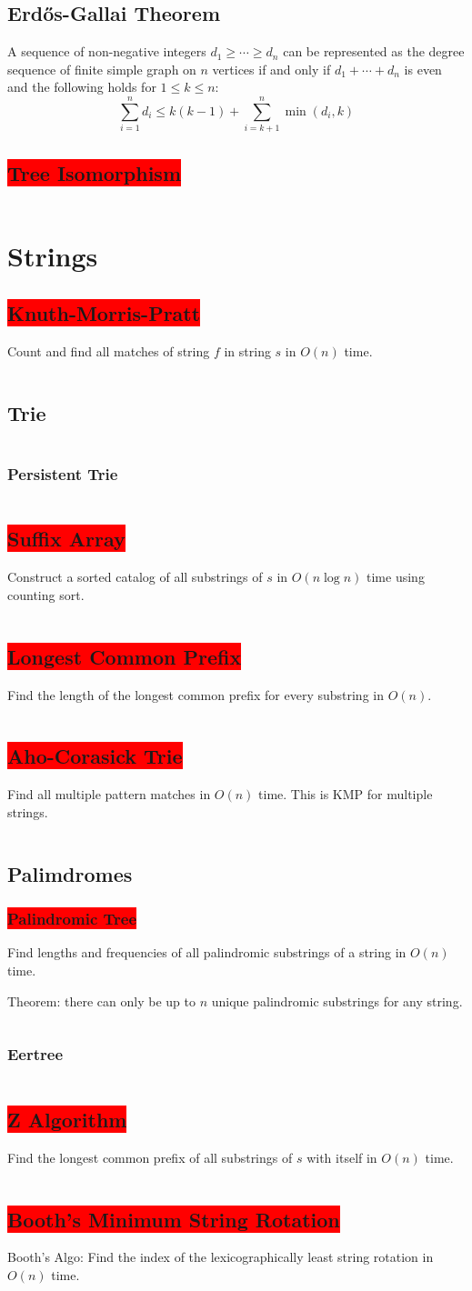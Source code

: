 \documentclass[8pt,a4paper,landscape,oneside]{amsart}
\newcommand{\code}[1]{\inputminted[fontsize=\normalsize,baselinestretch=1]{cpp}{_code/#1}}
\newcommand{\subsectionRed}[1]{\subsection{\colorbox{red}{\color{white}#1}}}
\newcommand{\subsubsectionRed}[1]{\subsubsection{\colorbox{red}{\color{white}#1}}}
\begin{document}
\begin{multicols*}{3}
  \subsection{Erd\H{o}s-Gallai Theorem}
    A sequence of non-negative integers $d_1 \ge \cdots \ge d_n$ can be represented as the
    degree sequence of finite simple graph on $n$ vertices if and only if $d_1 + \cdots + d_n$ is
    even and the following holds for $1 \le k \le n$:
    \[
    \sum_{i=1}^n d_i \le k(k-1) + \sum_{i=k+1}^n \min\left(d_i, k\right)
    \]
  \subsectionRed{Tree Isomorphism}
    \code{graphs/tree_isomorphism.cpp}
\section{Strings}
  \subsectionRed{Knuth-Morris-Pratt}
    Count and find all matches of string $f$ in string $s$ in $O(n)$ time.
    \code{strings/kmp.cpp}
  \subsection{Trie}
    \code{strings/trie.cpp}
    \subsubsection{Persistent Trie}
      \code{strings/trie_persistent.cpp}
  \subsectionRed{Suffix Array}
    Construct a sorted catalog of all substrings of $s$ in $O(n \log n)$ time using counting sort.
    \code{strings/suffix-array.cpp}
  \subsectionRed{Longest Common Prefix}
    Find the length of the longest common prefix for every substring in $O(n)$.
    \code{strings/lcp.cpp}
  \subsectionRed{Aho-Corasick Trie}
    Find all multiple pattern matches in $O(n)$ time. This is KMP for multiple strings.
    \code{strings/aho-corasick-trie.java}
  \subsection{Palimdromes}
    \subsubsectionRed{Palindromic Tree}
      Find lengths and frequencies of all palindromic substrings of a string in $O(n)$ time.

      Theorem: there can only be up to $n$ unique palindromic substrings for any string.
      \code{strings/palindromic-tree.cpp}
    \subsubsection{Eertree}
      \code{strings/eertree.cpp}
  \subsectionRed{Z Algorithm}
    Find the longest common prefix of all substrings of $s$ with itself in $O(n)$ time.
    \code{strings/z.cpp}
  \subsectionRed{Booth's Minimum String Rotation}
    Booth's Algo: Find the index of the lexicographically least string rotation in $O(n)$ time.
    \code{strings/booth.cpp}

\end{multicols*}
\end{document}
